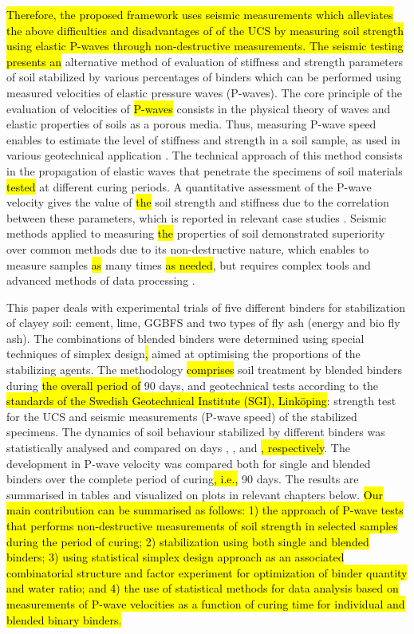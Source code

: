 \documentclass[materials,article,submit,pdftex,moreauthors]{Definitions/mdpi}
\begin{document}
\hl{Therefore, the proposed framework uses seismic measurements which alleviates the above difficulties and disadvantages of of the UCS by measuring soil strength using elastic P-waves through non-destructive measurements. The seismic testing presents an} alternative method of evaluation of stiffness and strength parameters of soil stabilized by various percentages of binders which can be performed using measured velocities of elastic pressure waves (P-waves). The core principle of the evaluation of velocities of \hl{P-waves} consists in the physical theory of waves and elastic properties of soils as a porous media. Thus, measuring P-wave speed enables to estimate the level of stiffness and strength in a soil sample, as used in various geotechnical application \citep{Gheibi,Jiangetal2021,Jiangetal2017,LindhLemenkova2021b,Lacidogna}. The technical approach of this method consists in the propagation of elastic waves that penetrate the specimens of soil materials \hl{tested} at different curing periods. A quantitative assessment of the P-wave velocity gives the value of \hl{the} soil strength and stiffness due to the correlation between these parameters, which is reported in relevant case studies \citep{LindhLemenkova2022c,LinWang2020,Kurtulus,Ryden}. Seismic methods applied to measuring \hl{the} properties of soil demonstrated superiority over common methods due to its non-destructive nature, which enables to measure samples \hl{as} many times \hl{as needed}, but requires complex tools and advanced methods of data processing \citep{Sarro,Shietal2017}. 

This paper deals with experimental trials of five different binders for stabilization of clayey soil: cement, lime, GGBFS and two types of fly ash (energy and bio fly ash). The combinations of blended binders were determined using special techniques of simplex design\hl{, }aimed at optimising the proportions of the stabilizing agents. The methodology \hl{comprises }soil treatment by blended binders during \hl{the overall period of} 90 days, and geotechnical tests according to the \hl{standards of the Swedish Geotechnical Institute (SGI), Link\"{o}ping}: strength test for the UCS and seismic measurements (P-wave speed) of the stabilized specimens. The dynamics of soil behaviour stabilized by different binders was statistically analysed and compared on days , ,  and \hl{, respectively}. The development in P-wave velocity was compared both for single and blended binders over the complete period of curing\hl{, i.e., }90 days. The results are summarised in tables and visualized on plots in relevant chapters below. \hl{Our main contribution can be summarised as follows: 1) the approach of P-wave tests that performs non-destructive measurements of soil strength in selected samples during the period of curing; 2) stabilization using both single and blended binders; 3) using statistical simplex design approach as an associated combinatorial structure and factor experiment for optimization of binder quantity and water ratio; and 4) the use of statistical methods for data analysis based on measurements of P-wave velocities as a function of curing time for individual and blended binary binders.} 
\end{document}
